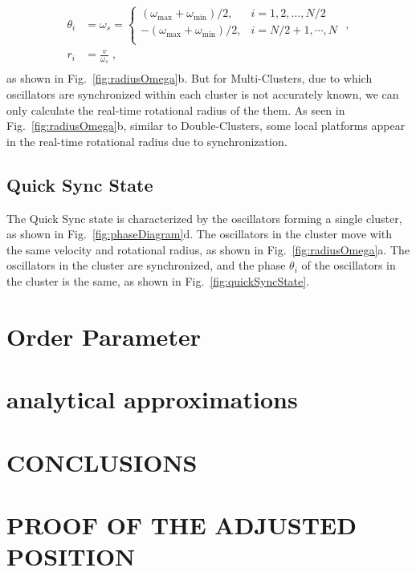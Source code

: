 \documentclass[%
 aip,
 amsmath,amssymb,
 reprint,%
]{revtex4-1}
\begin{document}
\begin{equation}
    \begin{aligned}
        \theta _i&=\omega _s=\begin{cases}
        \left( \omega _{\max}+\omega _{\min} \right) /2,&		i=1,2,\dots ,N/2\\
        -\left( \omega _{\max}+\omega _{\min} \right) /2,&		i=N/2+1,\cdots ,N\\
    \end{cases}\,\,,\\
        r_i&=\frac{v}{\omega _s}\;,\\
    \end{aligned}
\end{equation}
as shown in Fig.~\ref{fig:radiusOmega}b. But for Multi-Clusters, due to which oscillators are synchronized within each cluster is not accurately known, we can only calculate the real-time rotational radius of the them. As seen in Fig.~\ref{fig:radiusOmega}b, similar to Double-Clusters, some local platforms appear in the real-time rotational radius due to synchronization.

\subsection{Quick Sync State}

The Quick Sync state is characterized by the oscillators forming a single cluster, as shown in Fig.~\ref{fig:phaseDiagram}d. The oscillators in the cluster move with the same velocity and rotational radius, as shown in Fig.~\ref{fig:radiusOmega}a. The oscillators in the cluster are synchronized, and the phase $\theta_i$ of the oscillators in the cluster is the same, as shown in Fig.~\ref{fig:quickSyncState}.

\section{Order Parameter}

\section{\label{analytical} analytical approximations}

\section{CONCLUSIONS}

\appendix

\section{\label{sec:adj_pos} PROOF OF THE ADJUSTED POSITION}
\end{document}
